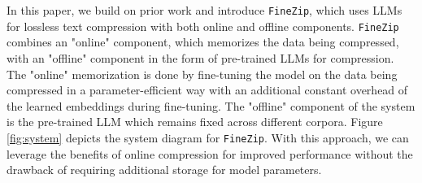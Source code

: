 \documentclass[11pt]{article}
\begin{document}






In this paper, we build on prior work and introduce \texttt{FineZip}, which uses LLMs for lossless text compression with both online and offline components. \texttt{FineZip} combines an "online" component, which memorizes the data being compressed, with an "offline" component in the form of pre-trained LLMs for compression. The "online" memorization is done by fine-tuning the model on the data being compressed in a parameter-efficient way \citep{hu2021lora, dettmers2023qlora} with an additional constant overhead of the learned embeddings during fine-tuning. The "offline" component of the system is the pre-trained LLM which remains fixed across different corpora. Figure \ref{fig:system} depicts the system diagram for \texttt{FineZip}. With this approach, we can leverage the benefits of online compression for improved performance without the drawback of requiring additional storage for model parameters. 
\end{document}
